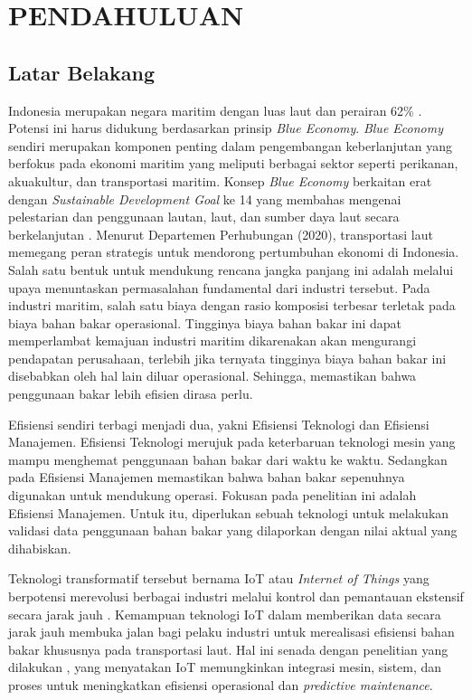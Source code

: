 \chapter{PENDAHULUAN}

\section{Latar Belakang}

Indonesia merupakan negara maritim dengan luas laut dan perairan 62\% \parencite{inproc:wuryadani}. Potensi ini harus didukung berdasarkan prinsip \textit{Blue Economy}. \textit{Blue Economy} sendiri merupakan komponen penting dalam pengembangan keberlanjutan yang berfokus pada ekonomi maritim yang meliputi berbagai sektor seperti perikanan, akuakultur, dan transportasi maritim. Konsep \textit{Blue Economy} berkaitan erat dengan \textit{Sustainable Development Goal} ke 14 yang membahas mengenai pelestarian dan penggunaan lautan, laut, dan sumber daya laut secara berkelanjutan \parencite{misc:lse}. Menurut Departemen Perhubungan (2020), transportasi laut memegang peran strategis untuk mendorong pertumbuhan ekonomi di Indonesia. Salah satu bentuk untuk mendukung rencana jangka panjang ini adalah melalui upaya menuntaskan permasalahan fundamental dari industri tersebut. Pada industri maritim, salah satu biaya dengan rasio komposisi terbesar terletak pada biaya bahan bakar operasional. Tingginya biaya bahan bakar ini dapat memperlambat kemajuan industri maritim dikarenakan akan mengurangi pendapatan perusahaan, terlebih jika ternyata tingginya biaya bahan bakar ini disebabkan oleh hal lain diluar operasional. Sehingga, memastikan bahwa penggunaan bakar lebih efisien dirasa perlu.

Efisiensi sendiri terbagi menjadi dua, yakni Efisiensi Teknologi dan Efisiensi Manajemen. Efisiensi Teknologi merujuk pada keterbaruan teknologi mesin yang mampu menghemat penggunaan bahan bakar dari waktu ke waktu. Sedangkan pada Efisiensi Manajemen memastikan bahwa bahan bakar sepenuhnya digunakan untuk mendukung operasi. Fokusan pada penelitian ini adalah Efisiensi Manajemen. Untuk itu, diperlukan sebuah teknologi untuk melakukan validasi data penggunaan bahan bakar yang dilaporkan dengan nilai aktual yang dihabiskan.

Teknologi transformatif tersebut bernama IoT atau \textit{Internet of Things} yang berpotensi merevolusi berbagai industri melalui kontrol dan pemantauan ekstensif secara jarak jauh \parencite{article:hercog}. Kemampuan teknologi IoT dalam memberikan data secara jarak jauh membuka jalan bagi pelaku industri untuk merealisasi efisiensi bahan bakar khususnya pada transportasi laut. Hal ini senada dengan penelitian yang dilakukan \textcite{article:suciu}, yang menyatakan IoT memungkinkan integrasi mesin, sistem, dan proses untuk meningkatkan efisiensi operasional dan \textit{predictive maintenance}.

